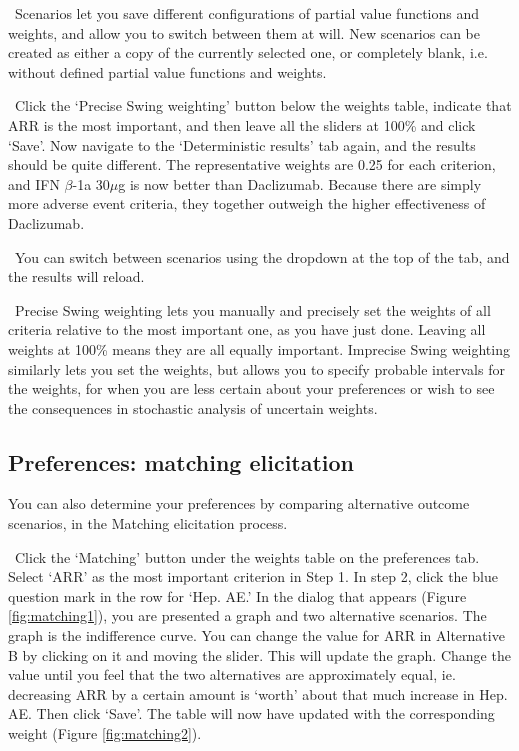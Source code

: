 \documentclass[00_mcda_tutorial.tex]{subfiles}
\begin{document}
\noindent \faGraduationCap \, Scenarios let you save different configurations of partial value functions and weights, and allow you to switch between them at will. New scenarios can be created as either a copy of the currently selected one, or completely blank, i.e. without defined partial value functions  and weights.
\newline

\noindent \leftpointright \, Click the ‘Precise Swing weighting’ button below the weights table, indicate that ARR is the most important, and then leave all the sliders at 100\% and click ‘Save’. Now navigate to the ‘Deterministic results’ tab again, and the results should be quite different. The representative weights are 0.25 for each criterion, and IFN $\beta$-1a 30$\mu$g is now better than Daclizumab. Because there are simply more adverse event criteria, they together outweigh the higher effectiveness of Daclizumab.
\newline

\noindent \faLightbulbO \, You can switch between scenarios using the dropdown at the top of the tab, and the results will reload.
\newline

\noindent \faGraduationCap \, Precise Swing weighting lets you manually and precisely set the weights of all criteria relative to the most important one, as you have just done. Leaving all weights at 100\% means they are all equally important. Imprecise Swing weighting similarly lets you set the weights, but allows you to specify probable intervals for the weights, for when you are less certain about your preferences or wish to see the consequences in stochastic analysis of uncertain weights.

\subsection*{Preferences: matching elicitation}
You can also determine your preferences by comparing alternative outcome scenarios, in the Matching elicitation process.
\newline

\noindent \leftpointright \, Click the ‘Matching’ button under the weights table on the preferences tab. Select ‘ARR’ as the most important criterion in Step 1. In step 2, click the blue question mark in the row for ‘Hep. AE.’ In the dialog that appears (Figure \ref{fig:matching1}), you are presented a graph and two alternative scenarios. The graph is the indifference curve. You can change the value for ARR in Alternative B by clicking on it and moving the slider. This will update the graph. Change the value until you feel that the two alternatives are approximately equal, ie. decreasing ARR by a certain amount is ‘worth’ about that much increase in Hep. AE. Then click ‘Save’. The table will now have updated with the corresponding weight (Figure \ref{fig:matching2}).
\newline
\end{document}
